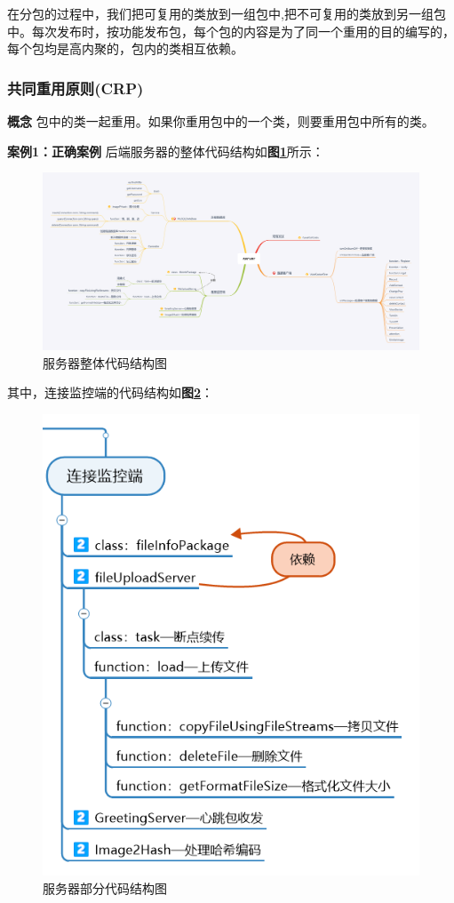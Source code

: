 \documentclass[article]{BJTU-thesis}
\begin{document}
在分包的过程中，我们把可复用的类放到一组包中,把不可复用的类放到另一组包中。每次发布时，按功能发布包，每个包的内容是为了同一个重用的目的编写的，每个包均是高内聚的，包内的类相互依赖。

\subsubsection{共同重用原则(CRP)}
\textbf{概念} 包中的类一起重用。如果你重用包中的一个类，则要重用包中所有的类。


\textbf{案例1：正确案例} 后端服务器的整体代码结构如\textbf{图\ref{fig:fig5}}所示：

\begin{figure}[!htbp]
	\centering
	\includegraphics[scale=0.12]{img/5.png}
	\caption{服务器整体代码结构图}\label{fig:fig5}
\end{figure}

其中，连接监控端的代码结构如\textbf{图\ref{fig:fig6}}：

\begin{figure}[!htbp]
	\centering
	\includegraphics[scale=0.7]{img/6.png}
	\caption{服务器部分代码结构图}\label{fig:fig6}
\end{figure}
\end{document}

